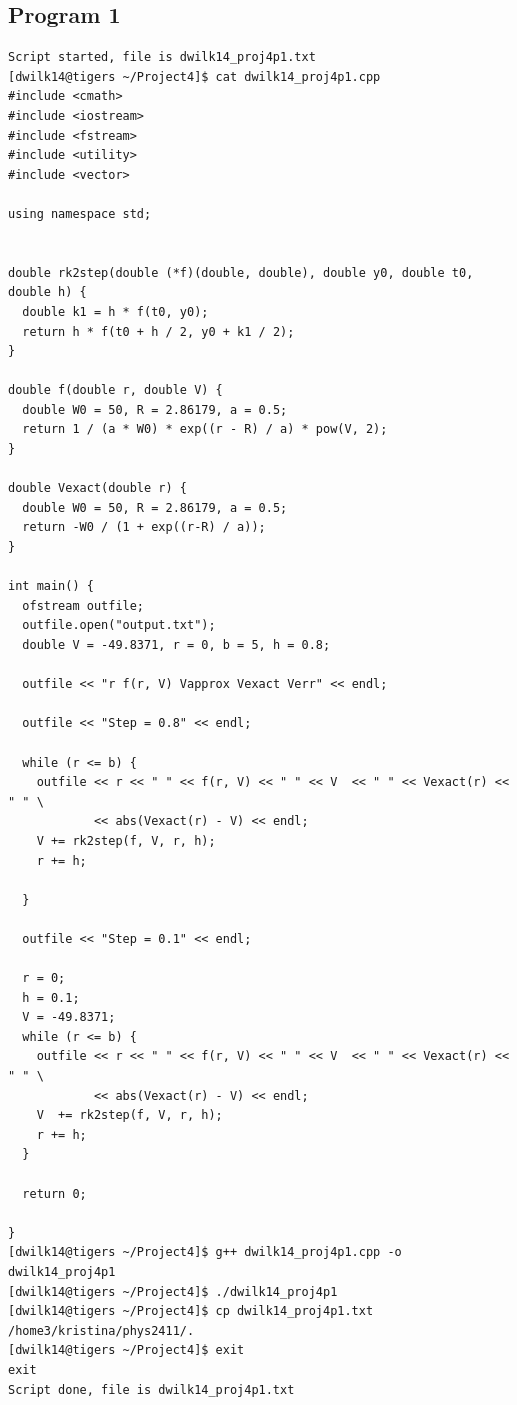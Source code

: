 \documentclass{article}
\begin{document}
\subsection*{Program 1}
\begin{verbatim}
Script started, file is dwilk14_proj4p1.txt
[dwilk14@tigers ~/Project4]$ cat dwilk14_proj4p1.cpp
#include <cmath>
#include <iostream>
#include <fstream>
#include <utility>
#include <vector>

using namespace std;


double rk2step(double (*f)(double, double), double y0, double t0, double h) {
  double k1 = h * f(t0, y0);
  return h * f(t0 + h / 2, y0 + k1 / 2);
}

double f(double r, double V) {
  double W0 = 50, R = 2.86179, a = 0.5;
  return 1 / (a * W0) * exp((r - R) / a) * pow(V, 2);
}

double Vexact(double r) {
  double W0 = 50, R = 2.86179, a = 0.5;
  return -W0 / (1 + exp((r-R) / a));
}

int main() {
  ofstream outfile;
  outfile.open("output.txt");
  double V = -49.8371, r = 0, b = 5, h = 0.8;

  outfile << "r f(r, V) Vapprox Vexact Verr" << endl;

  outfile << "Step = 0.8" << endl;
  
  while (r <= b) {
    outfile << r << " " << f(r, V) << " " << V  << " " << Vexact(r) << " " \
            << abs(Vexact(r) - V) << endl;
    V += rk2step(f, V, r, h);
    r += h;

  } 

  outfile << "Step = 0.1" << endl;
  
  r = 0;
  h = 0.1;
  V = -49.8371;
  while (r <= b) {
    outfile << r << " " << f(r, V) << " " << V  << " " << Vexact(r) << " " \
            << abs(Vexact(r) - V) << endl;
    V  += rk2step(f, V, r, h);
    r += h;
  }  

  return 0;

}
[dwilk14@tigers ~/Project4]$ g++ dwilk14_proj4p1.cpp -o dwilk14_proj4p1                                                                                                                      
[dwilk14@tigers ~/Project4]$ ./dwilk14_proj4p1
[dwilk14@tigers ~/Project4]$ cp dwilk14_proj4p1.txt /home3/kristina/phys2411/.
[dwilk14@tigers ~/Project4]$ exit
exit
Script done, file is dwilk14_proj4p1.txt
\end{verbatim}
\end{document}
